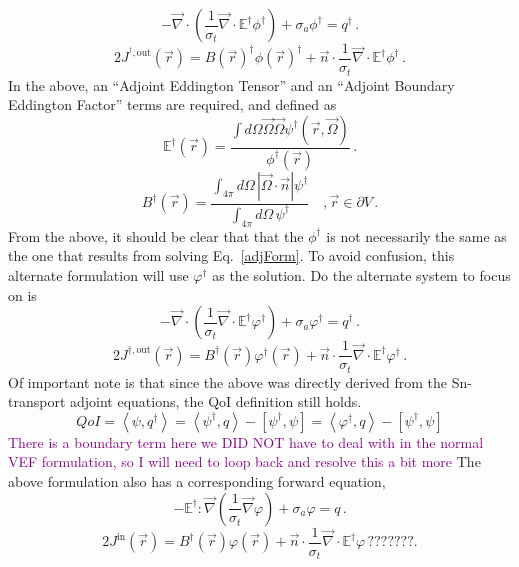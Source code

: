 \documentclass[12pt]{report}
\newcommand{\vr}{\vec{r}}
\newcommand{\vO}{\vec{\Omega}}
\newcommand{\bra}{\left\langle}
\newcommand{\ket}{\right\rangle}
\newcommand{\sbra}{\left[}
\newcommand{\sket}{\right]}
\renewcommand{\div}{\vec{\nabla} \cdot}
\newcommand{\grad}{\vec{\nabla}}
\newcommand{\bound}{\partial V}
\newcommand{\vn}{\vec{n}}
\newcommand{\Edd}{\mathbb{E}}
\newcommand{\BEdd}{B}
\newcommand{\sigt}{\sigma_t}
\newcommand{\siga}{\sigma_a}
\newcommand{\angSource}{q}
\newcommand{\scalSource}{q}
\newcommand{\comment}[2]{\marginpar{\textcolor{#2}{$\star$}}\textcolor{#2}{#1}\newline}
\newcommand{\todo}[1]{\comment{#1}{purple}}
\newcommand{\todo}[1]{\phantom{a}}
\begin{document}
\begin{equation}
\label{TranAdjVEFForm}
- \div \left( \frac{1}{\sigt}\div \Edd^\dag \phi^\dag  \right) + \siga \phi^\dag  = \scalSource^\dag  \,.
\end{equation}
\begin{equation}
2 J^{^\dag,\text{out}}(\vr) = \BEdd(\vr)^\dag \phi(\vr)^\dag  + \vn \cdot \frac{1}{\sigt} \div \Edd^\dag  \phi^\dag  \,.
\end{equation}
In the above, an ``Adjoint Eddington Tensor'' and an ``Adjoint Boundary Eddington Factor'' terms are required, and defined as
\begin{equation}
\label{AdjEddDef}
\Edd^\dag(\vr)=\frac{\int d\Omega \vO \vO \psi^\dag(\vr,\vO)}{\phi^\dag(\vr)} \, .
\end{equation} 
\begin{equation}
\BEdd^\dag(\vr) = \frac{\int_{4 \pi} d\Omega \, | \vO \cdot \vn | \psi^\dag}{\int_{4\pi} d\Omega \, \psi^\dag} \quad , \vr \in \bound \,.
\end{equation}
From the above, it should be clear that that the $\phi^\dag$ is not necessarily the same as the one that results from solving Eq.~\eqref{adjForm}. To avoid confusion, this alternate formulation will use $\varphi^\dag$ as the solution. Do the alternate system to focus on is 
\begin{equation}
\label{TranAdjVEFForm}
- \div \left( \frac{1}{\sigt}\div \Edd^\dag \varphi^\dag  \right) + \siga \varphi^\dag  = \scalSource^\dag  \,.
\end{equation}
\begin{equation}
2 J^{\dag,\text{out}}(\vr) = \BEdd^\dag(\vr) \varphi^\dag(\vr) + \vn \cdot \frac{1}{\sigt} \div \Edd^\dag  \varphi^\dag  \,.
\end{equation}
Of important note is that since the above was directly derived from the Sn-transport adjoint equations, the QoI definition  still holds.
\begin{equation}
\label{AdjQoIAlt}
QoI = \bra \psi , \angSource^\dag \ket = \bra \psi^\dag , \angSource \ket - \sbra \psi^\dag,  \psi \sket = \bra \varphi^\dag , \angSource \ket - \sbra \psi^\dag,  \psi \sket
\end{equation}
\todo{There is a boundary term here we DID NOT have to deal with in the normal VEF formulation, so I will need to loop back and resolve this a bit more}
The above formulation also has a corresponding forward equation,
\begin{equation}
\label{ForwardVEFAlt}
- \Edd^\dag : \grad \left( \frac{1}{\sigt}\grad \varphi \right) + \siga \varphi  = \scalSource  \,.
\end{equation}
\begin{equation}
2 J^{\text{in}}(\vr) = \BEdd^\dag(\vr) \varphi(\vr) + \vn \cdot \frac{1}{\sigt} \div \Edd^\dag  \varphi  \, ???????.
\end{equation} 
\end{document}
